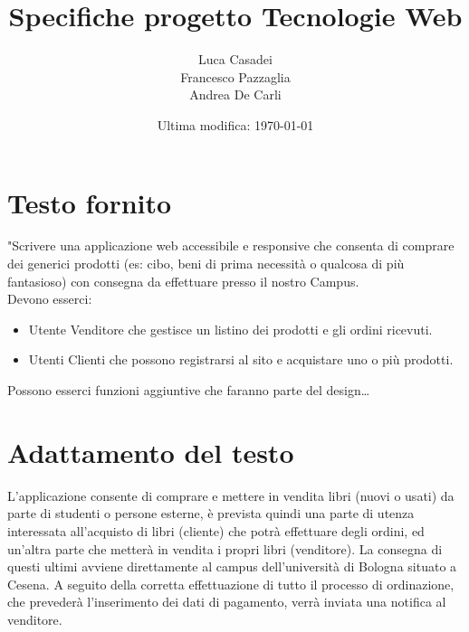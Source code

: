 \documentclass[a4paper]{article}
\author{Luca Casadei\\Francesco Pazzaglia\\Andrea De Carli}
\date{Ultima modifica: \today}
\title{\textbf{Specifiche progetto Tecnologie Web}}
\begin{document}
	\maketitle
	\tableofcontents
	\printnoidxglossaries
	\section{Testo fornito}
	"Scrivere una applicazione web accessibile e responsive che consenta di comprare dei generici prodotti (es:	cibo, beni di prima necessità o qualcosa di più fantasioso) con consegna da effettuare presso il nostro Campus.\\
	Devono esserci:
	\begin{itemize}
		\item Utente Venditore che gestisce un listino dei prodotti e gli ordini ricevuti.
		\item Utenti Clienti che possono registrarsi al sito e acquistare uno o più prodotti.
	\end{itemize}
	Possono esserci funzioni aggiuntive che faranno parte del design\dots\quotedblbase
	\section{Adattamento del testo}
	L'applicazione consente di comprare e mettere in vendita libri (nuovi o usati) da parte di studenti o persone esterne, è prevista quindi una parte di utenza interessata all'acquisto di libri (\gls{cliente}) che potrà effettuare degli ordini, ed un'altra parte che metterà in vendita i propri libri (\gls{venditore}). La consegna di questi ultimi avviene direttamente al \Gls{campus} dell'università di Bologna situato a Cesena. A seguito della corretta effettuazione di tutto il processo di ordinazione, che prevederà l'inserimento dei dati di pagamento, verrà inviata una notifica al venditore.\\
\end{document}

